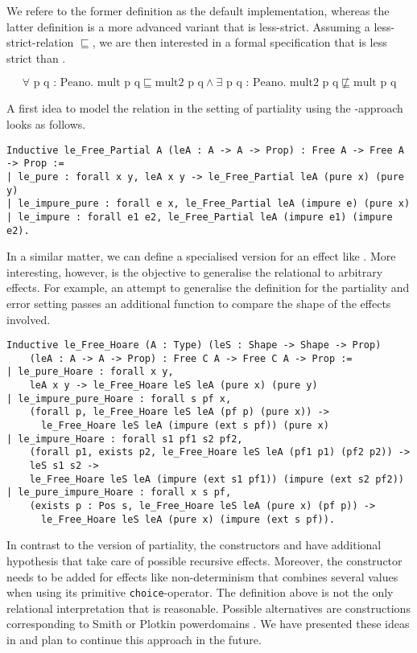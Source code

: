 We refere to the former definition as the default implementation,
whereas the latter definition is a more advanced variant that is
less-strict.
Assuming a less-strict-relation $\sqsubseteq$, we are then interested
in a formal specification that  is less strict than
.

\[
\forall \text{ p q : Peano}. \text{ mult p q} \sqsubseteq \text{mult2
  p q} \wedge \exists \text{ p q : Peano}. \text{ mult2 p q} \not \sqsubseteq \text{mult p q}
\]

A first idea to model the relation in the setting of partiality using
the -approach looks as follows.

\begin{verbatim}
Inductive le_Free_Partial A (leA : A -> A -> Prop) : Free A -> Free A -> Prop :=
| le_pure : forall x y, leA x y -> le_Free_Partial leA (pure x) (pure y)
| le_impure_pure : forall e x, le_Free_Partial leA (impure e) (pure x)
| le_impure : forall e1 e2, le_Free_Partial leA (impure e1) (impure e2).
\end{verbatim}

In a similar matter, we can define a specialised version for an effect like
.
More interesting, however, is the objective to generalise the
relational to arbitrary effects.
For example, an attempt to generalise the definition for the
partiality and error setting passes an additional function to compare
the shape of the effects involved.

\begin{verbatim}
Inductive le_Free_Hoare (A : Type) (leS : Shape -> Shape -> Prop)
    (leA : A -> A -> Prop) : Free C A -> Free C A -> Prop :=
| le_pure_Hoare : forall x y,
    leA x y -> le_Free_Hoare leS leA (pure x) (pure y)
| le_impure_pure_Hoare : forall s pf x,
    (forall p, le_Free_Hoare leS leA (pf p) (pure x)) ->
      le_Free_Hoare leS leA (impure (ext s pf)) (pure x)
| le_impure_Hoare : forall s1 pf1 s2 pf2,
    (forall p1, exists p2, le_Free_Hoare leS leA (pf1 p1) (pf2 p2)) ->
    leS s1 s2 ->
    le_Free_Hoare leS leA (impure (ext s1 pf1)) (impure (ext s2 pf2))
| le_pure_impure_Hoare : forall x s pf,
    (exists p : Pos s, le_Free_Hoare leS leA (pure x) (pf p)) ->
      le_Free_Hoare leS leA (pure x) (impure (ext s pf)).
\end{verbatim}

In contrast to the version of partiality, the constructors
 and  have additional
hypothesis that take care of possible recursive effects.
Moreover, the constructor  needs to be
added for effects like non-determinism that combines several values
when using its primitive \texttt{choice}-operator.
The definition above is not the only relational interpretation that is
reasonable.
Possible alternatives are constructions corresponding to Smith or
Plotkin powerdomains \citep{abramsky1994domain}.
We have presented these ideas in \citet{christiansen2019proving} and
plan to continue this approach in the future.

